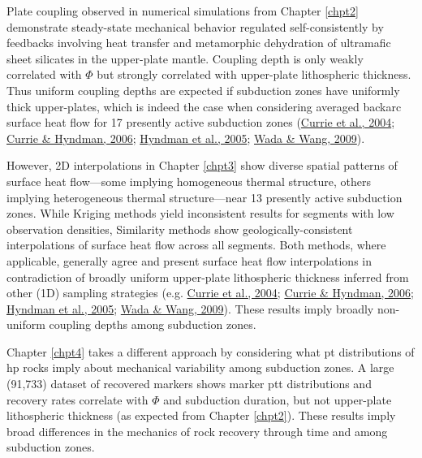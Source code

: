Plate coupling observed in numerical simulations from Chapter \ref{chpt2} demonstrate steady-state mechanical behavior regulated self-consistently by feedbacks involving heat transfer and metamorphic dehydration of ultramafic sheet silicates in the upper-plate mantle. Coupling depth is only weakly correlated with \(\Phi\) but strongly correlated with upper-plate lithospheric thickness. Thus uniform coupling depths are expected if subduction zones have uniformly thick upper-plates, which is indeed the case when considering averaged backarc surface heat flow for 17 presently active subduction zones (\protect\hyperlink{ref-currie2004}{Currie et al., 2004}; \protect\hyperlink{ref-currie2006}{Currie \& Hyndman, 2006}; \protect\hyperlink{ref-hyndman2005}{Hyndman et al., 2005}; \protect\hyperlink{ref-wada2009}{Wada \& Wang, 2009}).

However, 2D interpolations in Chapter \ref{chpt3} show diverse spatial patterns of surface heat flow---some implying homogeneous thermal structure, others implying heterogeneous thermal structure---near 13 presently active subduction zones. While Kriging methods yield inconsistent results for segments with low observation densities, Similarity methods show geologically-consistent interpolations of surface heat flow across all segments. Both methods, where applicable, generally agree and present surface heat flow interpolations in contradiction of broadly uniform upper-plate lithospheric thickness inferred from other (1D) sampling strategies (e.g. \protect\hyperlink{ref-currie2004}{Currie et al., 2004}; \protect\hyperlink{ref-currie2006}{Currie \& Hyndman, 2006}; \protect\hyperlink{ref-hyndman2005}{Hyndman et al., 2005}; \protect\hyperlink{ref-wada2009}{Wada \& Wang, 2009}). These results imply broadly non-uniform coupling depths among subduction zones.

Chapter \ref{chpt4} takes a different approach by considering what \gls{pt} distributions of \gls{hp} rocks imply about mechanical variability among subduction zones. A large (91,733) dataset of recovered markers shows marker \gls{ptt} distributions and recovery rates correlate with \(\Phi\) and subduction duration, but not upper-plate lithospheric thickness (as expected from Chapter \ref{chpt2}). These results imply broad differences in the mechanics of rock recovery through time and among subduction zones.

